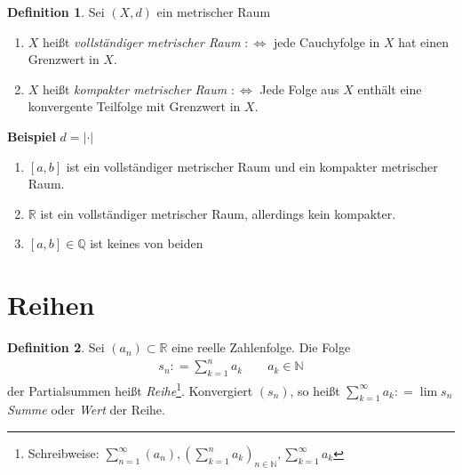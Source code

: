 \documentclass[ngerman,titlepage,twoside, parskip=half*]{scrreprt}
\newcommand*{\N}{\mathbb{N}}
\newcommand*{\Q}{\mathbb{Q}}
\newcommand*{\R}{\mathbb{R}}
\newcommand*{\perdef}{:\Leftrightarrow}
\theoremstyle{plain}
\theoremstyle{definition}
\newtheorem{definition}{Definition}
\theoremstyle{remark}
\newcommand*{\abs}[2][]{#1\lvert#2#1\rvert}
\newcommand*{\coloneqq}{\mathrel{\mathop:}=}
\begin{document}
\begin{definition}
\label{def:vollst}
Sei $(X,d)$ ein metrischer Raum
\begin{enumerate}[(1)]
  \item $X$ heißt \emph{vollständiger metrischer Raum} $\perdef$ jede Cauchyfolge 
    in $X$ hat einen Grenz\-wert in $X$.
  \item $X$ heißt \emph{kompakter metrischer Raum} $\perdef$ Jede Folge aus $X$ 
    enthält eine konvergente Teilfolge mit Grenzwert in $X$.
\end{enumerate}
\textbf{Beispiel} $d=\abs{\cdot }$
\begin{enumerate}[(1)]
  \item $[a,b]$ ist ein vollständiger metrischer Raum und ein kompakter metrischer Raum.
  \item $\R$ ist ein vollständiger metrischer Raum, allerdings kein kompakter.
  \item $[a,b]\in \Q$ ist keines von beiden
\end{enumerate}
\end{definition}

\section{Reihen}

\begin{definition}
\label{def:reihe}
Sei $(a_n) \subset \R$ eine reelle Zahlenfolge. Die Folge
\begin{gather*}s_n\coloneqq\sum_{k=1}^n a_k \qquad a_k \in \N\end{gather*} der
Partialsummen heißt
\emph{Reihe}\footnote{Schreibweise: $\sum_{n=1}^\infty
  (a_n), (\sum_{k=1}^n a_k)_{n\in \N}, \sum_{k=1}^\infty a_k$}.
Konvergiert $(s_n)$, so heißt $\sum_{k=1}^\infty a_k\coloneqq\lim s_n$
\emph{Summe} oder \emph{Wert} der
Reihe.
\end{definition}
\end{document}
